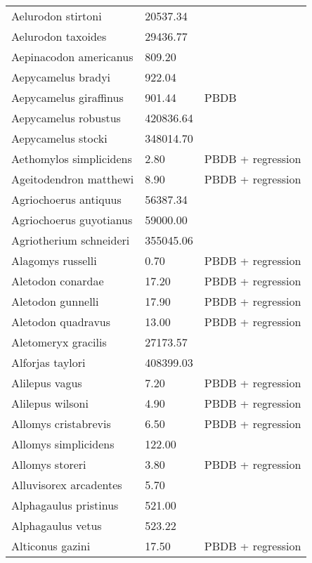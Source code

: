 \documentclass{article}
\begin{document}
\begin{center}
\begin{longtable}{p{} p{} p{}}
    Aelurodon stirtoni & 20537.34 & \cite{Tomiya2013} \\ 
    Aelurodon taxoides & 29436.77 & \cite{Tomiya2013} \\ 
    Aepinacodon americanus & 809.20 & \cite{Baskin2011} \\ 
    Aepycamelus bradyi & 922.04 & \cite{Dawson2012} \\ 
    Aepycamelus giraffinus & 901.44 & PBDB \\ 
    Aepycamelus robustus & 420836.64 & \cite{Tomiya2013} \\ 
    Aepycamelus stocki & 348014.70 & \cite{Tomiya2013} \\ 
    Aethomylos simplicidens & 2.80 & PBDB + regression \\ 
    Ageitodendron matthewi & 8.90 & PBDB + regression \\ 
    Agriochoerus antiquus & 56387.34 & \cite{Tomiya2013} \\ 
    Agriochoerus guyotianus & 59000.00 & \cite{McKenna2011} \\ 
    Agriotherium schneideri & 355045.06 & \cite{Tomiya2013} \\ 
    Alagomys russelli & 0.70 & PBDB + regression \\ 
    Aletodon conardae & 17.20 & PBDB + regression \\ 
    Aletodon gunnelli & 17.90 & PBDB + regression \\ 
    Aletodon quadravus & 13.00 & PBDB + regression \\ 
    Aletomeryx gracilis & 27173.57 & \cite{Tomiya2013} \\ 
    Alforjas taylori & 408399.03 & \cite{Tomiya2013} \\ 
    Alilepus vagus & 7.20 & PBDB + regression \\ 
    Alilepus wilsoni & 4.90 & PBDB + regression \\ 
    Allomys cristabrevis & 6.50 & PBDB + regression \\ 
    Allomys simplicidens & 122.00 & \cite{McKenna2011} \\ 
    Allomys storeri & 3.80 & PBDB + regression \\ 
    Alluvisorex arcadentes & 5.70 & \cite{Tomiya2013} \\ 
    Alphagaulus pristinus & 521.00 & \cite{McKenna2011} \\ 
    Alphagaulus vetus & 523.22 & \cite{Tomiya2013} \\ 
    Alticonus gazini & 17.50 & PBDB + regression \\ 

\end{longtable}
\end{center}
\end{document}
